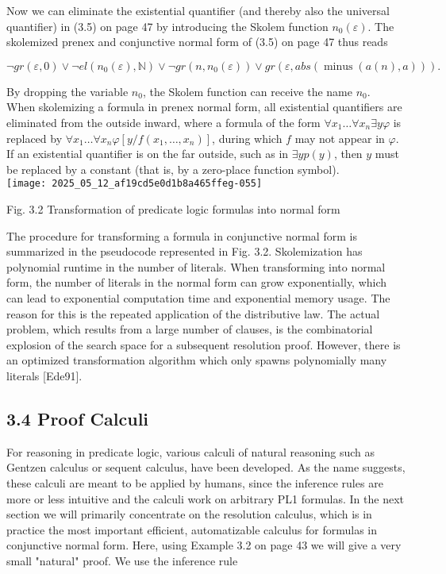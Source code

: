 \documentclass[10pt]{article}
\begin{document}
Now we can eliminate the existential quantifier (and thereby also the universal quantifier) in (3.5) on page 47 by introducing the Skolem function $n_{0}(\varepsilon)$. The skolemized prenex and conjunctive normal form of (3.5) on page 47 thus reads

$$
\neg g r(\varepsilon, 0) \vee \neg e l\left(n_{0}(\varepsilon), \mathbb{N}\right) \vee \neg g r\left(n, n_{0}(\varepsilon)\right) \vee g r(\varepsilon, a b s(\operatorname{minus}(a(n), a))) .
$$

By dropping the variable $n_{0}$, the Skolem function can receive the name $n_{0}$.\\
When skolemizing a formula in prenex normal form, all existential quantifiers are eliminated from the outside inward, where a formula of the form $\forall x_{1} \ldots \forall x_{n} \exists y \varphi$ is replaced by $\forall x_{1} \ldots \forall x_{n} \varphi\left[y / f\left(x_{1}, \ldots, x_{n}\right)\right]$, during which $f$ may not appear in $\varphi$. If an existential quantifier is on the far outside, such as in $\exists y p(y)$, then $y$ must be replaced by a constant (that is, by a zero-place function symbol).\\
\texttt{[image: 2025\_05\_12\_af19cd5e0d1b8a465ffeg-055]}

Fig. 3.2 Transformation of predicate logic formulas into normal form

The procedure for transforming a formula in conjunctive normal form is summarized in the pseudocode represented in Fig. 3.2. Skolemization has polynomial runtime in the number of literals. When transforming into normal form, the number of literals in the normal form can grow exponentially, which can lead to exponential computation time and exponential memory usage. The reason for this is the repeated application of the distributive law. The actual problem, which results from a large number of clauses, is the combinatorial explosion of the search space for a subsequent resolution proof. However, there is an optimized transformation algorithm which only spawns polynomially many literals [Ede91].

\subsection*{3.4 Proof Calculi}
For reasoning in predicate logic, various calculi of natural reasoning such as Gentzen calculus or sequent calculus, have been developed. As the name suggests, these calculi are meant to be applied by humans, since the inference rules are more or less intuitive and the calculi work on arbitrary PL1 formulas. In the next section we will primarily concentrate on the resolution calculus, which is in practice the most important efficient, automatizable calculus for formulas in conjunctive normal form. Here, using Example 3.2 on page 43 we will give a very small "natural" proof. We use the inference rule
\end{document}
